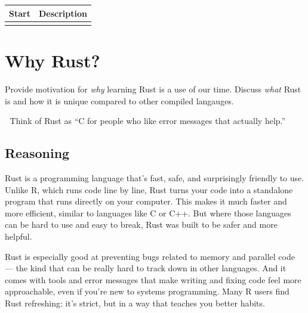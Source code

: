 \documentclass[
  letterpaper,
  DIV=11,
  numbers=noendperiod,
  oneside]{scrreprt}
\begin{document}
\begin{longtable}[]{@{}ll@{}}
\toprule\noalign{}
Start & Description \\
\midrule\noalign{}
\endhead
\bottomrule\noalign{}
\endlastfoot
\end{longtable}

\chapter{Why Rust?}\label{why-rust}

\begin{tcolorbox}[enhanced jigsaw, titlerule=0mm, coltitle=black, opacitybacktitle=0.6, bottomrule=.15mm, bottomtitle=1mm, colframe=quarto-callout-tip-color-frame, toprule=.15mm, opacityback=0, rightrule=.15mm, leftrule=.75mm, breakable, left=2mm, colback=white, colbacktitle=quarto-callout-tip-color!10!white, toptitle=1mm, title=\textcolor{quarto-callout-tip-color}{\faLightbulb}\hspace{0.5em}{Objective}, arc=.35mm]

Provide motivation for \emph{why} learning Rust is a use of our time.
Discuss \emph{what} Rust is and how it is unique compared to other
compiled langauges.

🧠 Think of Rust as ``C for people who like error messages that actually
help.''

\end{tcolorbox}

\section{Reasoning}\label{reasoning}

Rust is a programming language that's fast, safe, and surprisingly
friendly to use. Unlike R, which runs code line by line, Rust turns your
code into a standalone program that runs directly on your computer. This
makes it much faster and more efficient, similar to languages like C or
C++. But where those languages can be hard to use and easy to break,
Rust was built to be safer and more helpful.

Rust is especially good at preventing bugs related to memory and
parallel code --- the kind that can be really hard to track down in
other languages. And it comes with tools and error messages that make
writing and fixing code feel more approachable, even if you're new to
systems programming. Many R users find Rust refreshing: it's strict, but
in a way that teaches you better habits.
\end{document}
